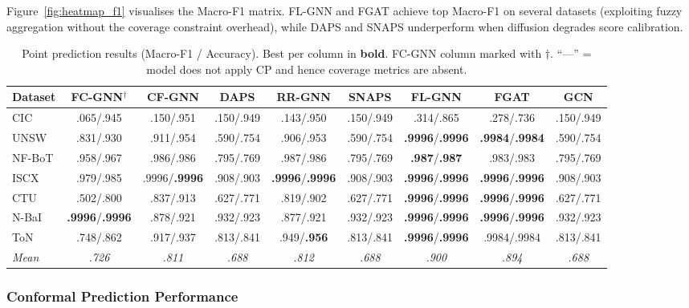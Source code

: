 Figure~\ref{fig:heatmap_f1} visualises the Macro-F1 matrix.
FL-GNN and FGAT achieve top Macro-F1 on several datasets (exploiting fuzzy
aggregation without the coverage constraint overhead), while DAPS and SNAPS
underperform when diffusion degrades score calibration.

\begin{table}[t]
\caption{Point prediction results (Macro-F1 / Accuracy).
         Best per column in \textbf{bold}. FC-GNN column marked with $\dagger$.
         ``---'' = model does not apply CP and hence coverage metrics are absent.}
\label{tab:f1_main}
\setlength{\tabcolsep}{0.5pt}
\tiny
\begin{tabular}{lcccccccc}
\toprule
Dataset & FC-GNN$^\dagger$ & CF-GNN & DAPS & RR-GNN & SNAPS & FL-GNN & FGAT & GCN \\
\midrule
CIC    & .065/.945 & .150/.951 & .150/.949 & .143/.950 & .150/.949 & .314/.865 & .278/.736 & .150/.949 \\
UNSW   & .831/.930 & .911/.954 & .590/.754 & .906/.953 & .590/.754 & \textbf{.9996}/\textbf{.9996} & \textbf{.9984}/\textbf{.9984} & .590/.754 \\
NF-BoT & .958/.967 & .986/.986 & .795/.769 & .987/.986 & .795/.769 & \textbf{.987}/\textbf{.987} & .983/.983 & .795/.769 \\
ISCX   & .979/.985 & .9996/\textbf{.9996} & .908/.903 & \textbf{.9996}/\textbf{.9996} & .908/.903 & \textbf{.9996}/\textbf{.9996} & \textbf{.9996}/\textbf{.9996} & .908/.903 \\
CTU    & .502/.800 & .837/.913 & .627/.771 & .819/.902 & .627/.771 & \textbf{.9996}/\textbf{.9996} & \textbf{.9996}/\textbf{.9996} & .627/.771 \\
N-BaI  & \textbf{.9996}/\textbf{.9996} & .878/.921 & .932/.923 & .877/.921 & .932/.923 & \textbf{.9996}/\textbf{.9996} & \textbf{.9996}/\textbf{.9996} & .932/.923 \\
ToN    & .748/.862 & .917/.937 & .813/.841 & .949/\textbf{.956} & .813/.841 & \textbf{.9996}/\textbf{.9996} & .9984/.9984 & .813/.841 \\
\midrule
\textit{Mean} & \textit{.726} & \textit{.811} & \textit{.688} & \textit{.812} & \textit{.688} & \textit{.900} & \textit{.894} & \textit{.688} \\
\bottomrule
\end{tabular}
\end{table}

\subsubsection{Conformal Prediction Performance}


